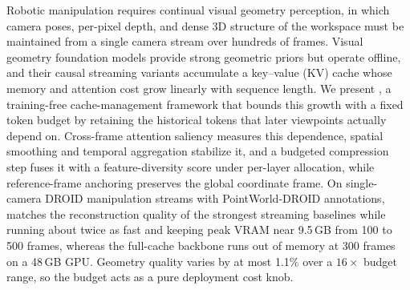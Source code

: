 Robotic manipulation requires continual visual geometry perception, in which camera poses, per-pixel depth, and dense 3D structure of the workspace must be maintained from a single camera stream over hundreds of frames. Visual geometry foundation models provide strong geometric priors but operate offline, and their causal streaming variants accumulate a key--value (KV) cache whose memory and attention cost grow linearly with sequence length. We present \method{}, a training-free cache-management framework that bounds this growth with a fixed token budget by retaining the historical tokens that later viewpoints actually depend on. Cross-frame attention saliency measures this dependence, spatial smoothing and temporal aggregation stabilize it, and a budgeted compression step fuses it with a feature-diversity score under per-layer allocation, while reference-frame anchoring preserves the global coordinate frame. On single-camera DROID manipulation streams with PointWorld-DROID annotations, \method{} matches the reconstruction quality of the strongest streaming baselines while running about twice as fast and keeping peak VRAM near 9.5\,GB from 100 to 500 frames, whereas the full-cache backbone runs out of memory at 300 frames on a 48\,GB GPU. Geometry quality varies by at most 1.1\% over a $16\times$ budget range, so the budget acts as a pure deployment cost knob.
